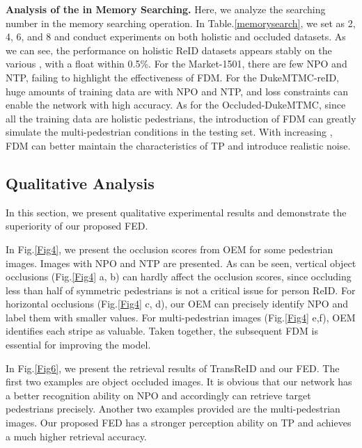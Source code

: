 \documentclass[10pt,twocolumn,letterpaper]{article}
\begin{document}
\textbf{Analysis of the  in Memory Searching.}
Here, we analyze the searching number  in the memory searching operation. In Table.\ref{memorysearch}, we set  as 2, 4, 6, and 8 and conduct experiments on both holistic and occluded datasets. As we can see, the performance on holistic ReID datasets appears stably on the various , with a float within 0.5\%. For the Market-1501, there are few NPO and NTP, failing to highlight the effectiveness of FDM. For the DukeMTMC-reID, huge amounts of training data are with NPO and NTP, and loss constraints can enable the network with high accuracy. 
As for the Occluded-DukeMTMC, since all the training data are holistic pedestrians, the introduction of FDM can greatly simulate the multi-pedestrian conditions in the testing set. With increasing , FDM can better maintain the characteristics of TP and introduce realistic noise.  


\subsection{Qualitative Analysis}
In this section, we present qualitative experimental results and demonstrate the superiority of our proposed FED. 


In Fig.\ref{Fig4}, we present the occlusion scores from OEM for some pedestrian images. Images with NPO and NTP are presented. As can be seen, vertical object occlusions (Fig.\ref{Fig4} a, b) can hardly affect the occlusion scores, since occluding less than half of symmetric pedestrians is not a critical issue for person ReID. For horizontal occlusions (Fig.\ref{Fig4} c, d), our OEM can precisely identify NPO and label them with smaller values. For multi-pedestrian images (Fig.\ref{Fig4} e,f), OEM identifies each stripe as valuable. Taken together, the subsequent FDM is essential for improving the model.


In Fig.\ref{Fig6}, we present the retrieval results of TransReID and our FED. The first two examples are object occluded images. It is obvious that our network has a better recognition ability on NPO and accordingly can retrieve target pedestrians precisely. Another two examples provided are the multi-pedestrian images. Our proposed FED has a stronger perception ability on TP and achieves a much higher retrieval accuracy.
\end{document}
